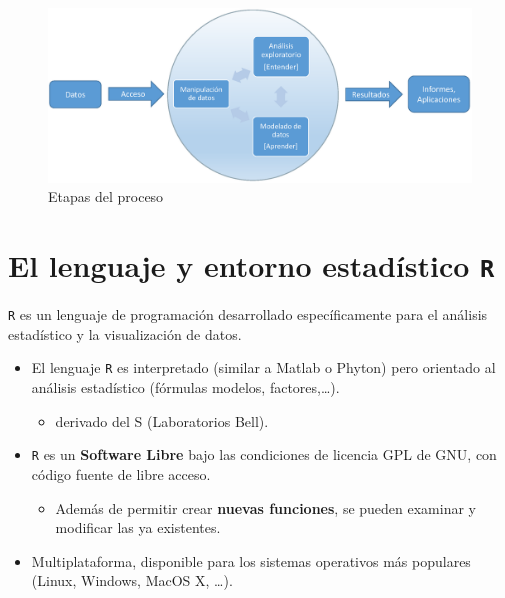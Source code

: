 \documentclass[]{book}
\providecommand{\tightlist}{%
  \setlength{\itemsep}{0pt}\setlength{\parskip}{0pt}}
\begin{document}
\begin{figure}[!htb]

{\centering \includegraphics[width=0.7\linewidth]{figuras/esquema2} 

}

\caption{Etapas del proceso}\label{fig:esquema}
\end{figure}

\hypertarget{el-lenguaje-y-entorno-estadistico-r}{%
\section{\texorpdfstring{El lenguaje y entorno estadístico \texttt{R}}{El lenguaje y entorno estadístico R}}\label{el-lenguaje-y-entorno-estadistico-r}}

\texttt{R} es un lenguaje de programación desarrollado específicamente para el
análisis estadístico y la visualización de datos.

\begin{itemize}
\item
  El lenguaje \texttt{R} es interpretado (similar a Matlab o Phyton) pero orientado al
  análisis estadístico (fórmulas modelos, factores,\ldots{}).

  \begin{itemize}
  \tightlist
  \item
    derivado del S (Laboratorios Bell).
  \end{itemize}
\item
  \texttt{R} es un \textbf{Software Libre} bajo las condiciones de licencia GPL de
  GNU, con código fuente de libre acceso.

  \begin{itemize}
  \tightlist
  \item
    Además de permitir crear \textbf{nuevas funciones},
    se pueden examinar y modificar las ya existentes.
  \end{itemize}
\item
  Multiplataforma,
  disponible para los sistemas operativos más populares (Linux, Windows, MacOS X, \ldots{}).
\end{itemize}
\end{document}
